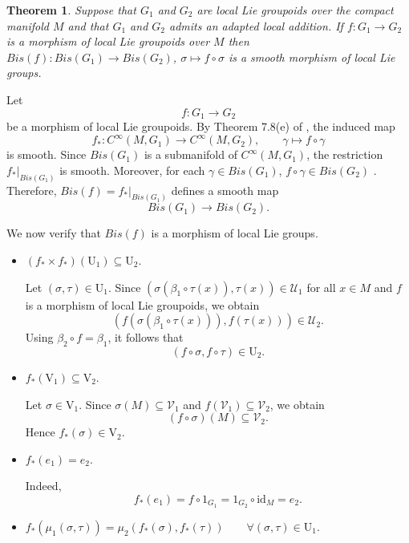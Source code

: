 \documentclass[12pt,a4paper]{amsart}
\makeatletter
\theoremstyle{plain}
\newtheorem{theorem}{Theorem}[section]
\theoremstyle{definition}
\renewenvironment{proof}[1][\proofname]{%
  \par\vspace{0.1em} %
  \pushQED{\qed}%
  \normalfont \topsep0pt \trivlist
  \item[\hskip\labelsep\itshape #1\@addpunct{.}]\ignorespaces
}{%
  \popQED\endtrivlist\@endpefalse
}
\makeatother
\begin{document}
\begin{theorem}\label{th0}
    Suppose that $G_1$ and $G_2$ are local Lie groupoids over the compact manifold $M$ and that $G_1$ and $G_2$ admits an adapted local addition. If $f: G_1 \rightarrow G_2$ is a morphism of local Lie groupoids over $M$ then
    $Bis(f): Bis(G_1) \rightarrow Bis(G_2)$, $\sigma \mapsto f \circ \sigma$ is a smooth morphism of local Lie groups.
\end{theorem}
\begin{proof}
  
Let
\[
f:G_1\to G_2
\]
be a morphism of local Lie groupoids. By Theorem 7.8(e) of \cite{Schmeding}, the induced map
\[
f_*:C^\infty(M,G_1)\to C^\infty(M,G_2),
\qquad
\gamma\mapsto f\circ \gamma
\]
is smooth. Since $Bis(G_1)$ is a submanifold of $C^\infty(M,G_1)$, the restriction
$f_*|_{Bis(G_1)}$ 
is smooth. Moreover, for each $\gamma\in Bis(G_1)$,
$f\circ \gamma\in Bis(G_2)$ .
Therefore, $Bis(f)=f_*|_{Bis(G_1)}$ 
defines a smooth map
\[
Bis(G_1)\to Bis(G_2).
\]

We now verify that $Bis(f)$ is a morphism of local Lie groups.


\begin{itemize}
    \setlength{\itemsep}{0.5em}


    \item  $ (f_*\times f_*)(\mathrm U_1)\subseteq \mathrm U_2$.

    Let $(\sigma,\tau)\in \mathrm U_1$. Since
     $(\sigma(\beta_1\circ\tau(x)),\tau(x))
    \in
    \mathcal U_1$
    for all $x\in M$ and $f$ is a morphism of local Lie groupoids, we obtain
    \[
    (f(\sigma(\beta_1\circ\tau(x))),f(\tau(x)))
    \in
    \mathcal U_2.
    \]
    Using $\beta_2\circ f=\beta_1$, it follows that
    \[
    (f\circ\sigma,f\circ\tau)\in \mathrm U_2.
    \]

    \item $f_*(\mathrm V_1)\subseteq \mathrm V_2$.

    Let $\sigma\in \mathrm V_1$. Since
    $\sigma(M)\subseteq \mathcal V_1$
    and $f(\mathcal V_1)\subseteq \mathcal V_2$, we obtain
    \[
    (f\circ\sigma)(M)\subseteq \mathcal V_2.
    \]
    Hence $f_*(\sigma)\in \mathrm V_2$.

    \item $f_*(e_1)=e_2$.

    Indeed,
    \[
    f_*(e_1)
    =
    f\circ 1_{G_1}
    =
    1_{G_2}\circ \mathrm{id}_M
    =
    e_2.
    \]

    \item $f_*(\mu_1(\sigma,\tau))
    =
    \mu_2(f_*(\sigma),f_*(\tau))
    \qquad
    \forall (\sigma,\tau)\in \mathrm U_1$.


\end{itemize}
\end{proof}
\end{document}
